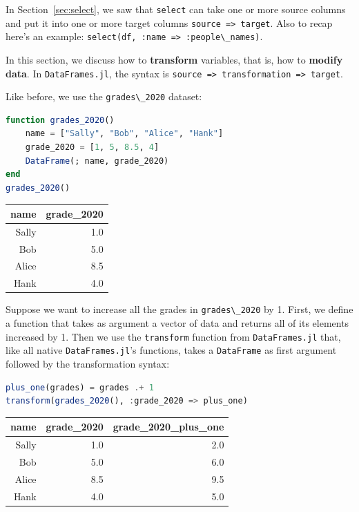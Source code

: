 \documentclass[
  notoc %
]{tufte-book}
\newcommand{\passthrough}[1]{#1}
\begin{document}
In Section~\ref{sec:select}, we saw that
\passthrough{\lstinline!select!} can take one or more source columns and
put it into one or more target columns
\passthrough{\lstinline!source => target!}. Also to recap here's an
example: \passthrough{\lstinline!select(df, :name => :people\_names)!}.

In this section, we discuss how to \textbf{transform} variables, that
is, how to \textbf{modify data}. In
\passthrough{\lstinline!DataFrames.jl!}, the syntax is
\passthrough{\lstinline!source => transformation => target!}.

Like before, we use the \passthrough{\lstinline!grades\_2020!} dataset:

\begin{lstlisting}[language=Julia]
function grades_2020()
    name = ["Sally", "Bob", "Alice", "Hank"]
    grade_2020 = [1, 5, 8.5, 4]
    DataFrame(; name, grade_2020)
end
grades_2020()
\end{lstlisting}

\begin{longtable}[]{@{}rr@{}}
\toprule
name & grade\_2020 \\
\midrule
\endhead
Sally & 1.0 \\
Bob & 5.0 \\
Alice & 8.5 \\
Hank & 4.0 \\
\bottomrule
\end{longtable}

Suppose we want to increase all the grades in
\passthrough{\lstinline!grades\_2020!} by 1. First, we define a function
that takes as argument a vector of data and returns all of its elements
increased by 1. Then we use the \passthrough{\lstinline!transform!}
function from \passthrough{\lstinline!DataFrames.jl!} that, like all
native \passthrough{\lstinline!DataFrames.jl!}'s functions, takes a
\passthrough{\lstinline!DataFrame!} as first argument followed by the
transformation syntax:

\begin{lstlisting}[language=Julia]
plus_one(grades) = grades .+ 1
transform(grades_2020(), :grade_2020 => plus_one)
\end{lstlisting}

\begin{longtable}[]{@{}rrr@{}}
\toprule
name & grade\_2020 & grade\_2020\_plus\_one \\
\midrule
\endhead
Sally & 1.0 & 2.0 \\
Bob & 5.0 & 6.0 \\
Alice & 8.5 & 9.5 \\
Hank & 4.0 & 5.0 \\
\bottomrule
\end{longtable}
\end{document}
